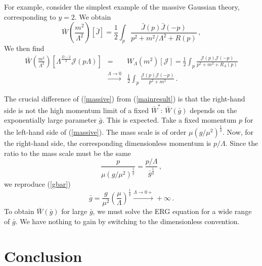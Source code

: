 \documentclass[aps,prd,preprint,groupedaddress,preprintnumbers,longbibliography]{revtex4-1}
\newcommand{\nn}{\nonumber}
\newcommand{\JJ}{\mathcal{J}}
\begin{document}
For example, consider the simplest example of the massive Gaussian
theory, corresponding to $y=2$.  We obtain
\begin{equation}
\bar{W} \left(\frac{m^2}{\Lambda^2}\right) [\bar{J}]
= \frac{1}{2} \int_p \frac{\bar{J} (p) \bar{J} (-p)}{p^2 +
  m^2/\Lambda^2 + R (p)} \,,
\end{equation}
We then find
\begin{eqnarray}
  \bar{W} \left(\frac{m^2}{\Lambda^2}\right)
  \left[ \Lambda^{\frac{D-2}{2}} \JJ (p \Lambda) \right] 
  &=& W_\Lambda (m^2) [\JJ] 
= \frac{1}{2} \int_p \frac{\JJ (p) \JJ
    (-p)}{p^2 + m^2 + R_\Lambda (p)}\nn\\
&\stackrel{\Lambda \to 0}{\longrightarrow}& \frac{1}{2} \int_p \frac{\JJ
    (p) \JJ(-p)}{p^2+ m^2}\,.
\end{eqnarray}

The crucial difference of (\ref{massive}) from (\ref{mainresult}) is
that the right-hand side is not the high momentum limit of a fixed
$\bar{W}^*$: $\bar{W} (\bar{g})$ depends on the exponentially large
parameter $\bar{g}$.  This is expected.  Take a fixed momentum $p$ for
the left-hand side of (\ref{massive}).  The mass scale is of order
$\mu (g/\mu^2)^{\frac{1}{y}}$.  Now, for the right-hand side, the
corresponding dimensionless momentum is $p/\Lambda$.  Since the ratio
to the mass scale must be the same
\begin{equation}
\frac{p}{\mu (g/\mu^2)^{\frac{1}{y}}} =
\frac{p/\Lambda}{\bar{g}^{\frac{1}{y}}}\,,
\end{equation}
we reproduce (\ref{gbar})
\begin{equation}
\bar{g} = \frac{g}{\mu^2}
\left(\frac{\mu}{\Lambda}\right)^{\frac{1}{y}}
\stackrel{\Lambda \to 0+}{\longrightarrow} + \infty\,.
\end{equation}
To obtain $\bar{W} (\bar{g})$ for large $\bar{g}$, we must solve the
ERG equation for a wide range of $\bar{g}$.  We have nothing to gain
by switching to the dimensionless convention.


\section{Conclusion\label{conclusion}}
\end{document}
